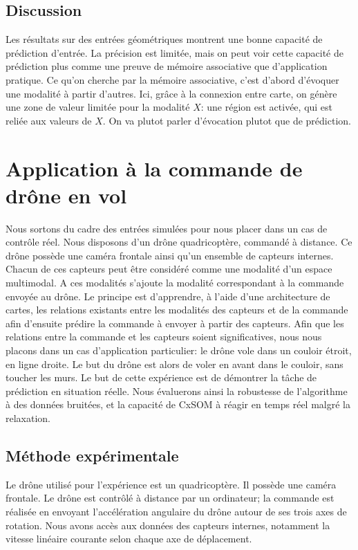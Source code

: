 \subsection{Discussion}
Les résultats sur des entrées géométriques montrent une bonne capacité de prédiction d'entrée.
La précision est limitée, mais on peut voir cette capacité de prédiction plus comme une preuve de mémoire associative que d'application pratique.
Ce qu'on cherche par la mémoire associative, c'est d'abord d'évoquer une modalité à partir d'autres. Ici, grâce à la connexion entre carte, on génère une zone de valeur limitée pour la modalité $X$: une région est activée, qui est reliée aux valeurs de $X$.
On va plutot parler d'évocation plutot que de prédiction. 

\section{Application à la commande de drône en vol}

Nous sortons du cadre des entrées simulées pour nous placer dans un cas de contrôle réel. Nous disposons d'un drône quadricoptère, commandé à distance. Ce drône possède une caméra frontale ainsi qu'un ensemble de capteurs internes. Chacun de ces capteurs peut être considéré comme une modalité d'un espace multimodal. A ces modalités s'ajoute la modalité correspondant à la commande envoyée au drône.
Le principe est d'apprendre, à l'aide d'une architecture de cartes, les relations existants entre les modalités des capteurs et de la commande afin d'ensuite prédire la commande à envoyer à partir des capteurs.
Afin que les relations entre la commande et les capteurs soient significatives, nous nous placons dans un cas d'application particulier: le drône vole dans un couloir étroit, en ligne droite. Le but du drône est alors de voler en avant dans le couloir, sans toucher les murs.
Le but de cette expérience est de démontrer la tâche de prédiction en situation réelle. Nous évaluerons ainsi la robustesse de l'algorithme à des données bruitées, et la capacité de CxSOM à réagir en temps réel malgré la relaxation.

\subsection{Méthode expérimentale}

Le drône utilisé pour l'expérience est un quadricoptère. Il possède une caméra frontale.
Le drône est contrôlé à distance par un ordinateur; la commande est réalisée en envoyant l'accélération angulaire du drône autour de ses trois axes de rotation.
Nous avons accès aux données des capteurs internes, notamment la vitesse linéaire courante selon chaque axe de déplacement.

